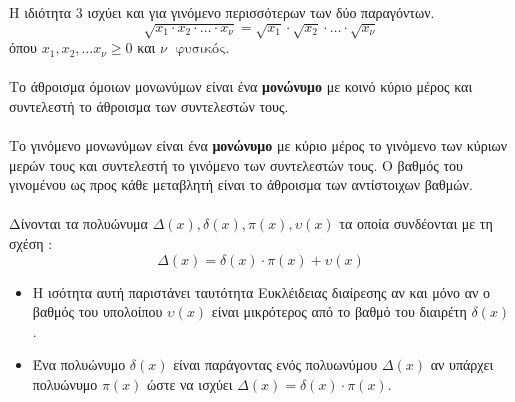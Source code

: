 \documentclass[twoside,nofonts,internet,shmeiwseis]{thewria}
\begin{document}
Η ιδιότητα 3 ισχύει και για γινόμενο περισσότερων των δύο παραγόντων. \[ \sqrt{x_1\cdot x_2\cdot\ldots\cdot x_\nu}=\!\sqrt{x_1}\cdot\!\sqrt{x_2}\cdot\ldots\cdot\!\sqrt{x_\nu} \] όπου $ x_1,x_2,\ldots x_\nu\geq0 $ και $ \nu\;\textrm{ φυσικός} $.\\\\
Το άθροισμα όμοιων μονωνύμων είναι ένα \textbf{μονώνυμο} με κοινό κύριο μέρος και συντελεστή το άθροισμα των συντελεστών τους.\\\\
Το γινόμενο μονωνύμων είναι ένα \textbf{μονώνυμο} με κύριο μέρος το γινόμενο των κύριων μερών τους και συντελεστή το γινόμενο των συντελεστών τους. Ο βαθμός του γινομένου ως προς κάθε μεταβλητή είναι το άθροισμα των αντίστοιχων βαθμών.\\\\
Δίνονται τα πολυώνυμα $ \varDelta(x),\delta(x),\pi(x),\upsilon(x) $ τα οποία συνδέονται με τη σχέση :
\[ \varDelta(x)=\delta(x)\cdot\pi(x)+\upsilon(x) \]
\begin{itemize}
\item Η ισότητα αυτή παριστάνει ταυτότητα Ευκλέιδειας διαίρεσης αν και μόνο αν ο βαθμός του υπολοίπου $ \upsilon(x) $ είναι μικρότερος από το βαθμό του διαιρέτη $ \delta(x) $.
\item Ένα πολυώνυμο $ \delta(x) $ είναι παράγοντας ενός πολυωνύμου $ \varDelta(x) $ αν υπάρχει πολυώνυμο $ \pi(x) $ ώστε να ισχύει $ \varDelta(x)=\delta(x)\cdot\pi(x) $.
\end{itemize}
\end{document}
